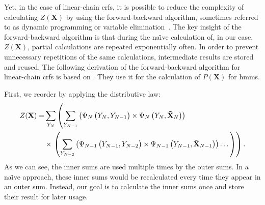 Yet, in the case of \glspl{linear-chain crf}, it is possible to reduce the complexity of calculating $Z(\mathbf{X})$ by using the \gls{forward-backward algorithm}, sometimes referred to as dynamic programming or variable elimination~\citep{sutton2010introduction,koller2009probabilistic}.
The key insight of the \gls{forward-backward algorithm} is that during the na\"{\i}ve calculation of, in our case, $Z(\mathbf{X})$, partial calculations are repeated exponentially often.
In order to prevent unnecessary repetitions of the same calculations, intermediate results are stored and reused.
The following derivation of the \gls{forward-backward algorithm} for \glspl{linear-chain crf} is based on \citet{sutton2010introduction}.
They use it for the calculation of $P(\mathbf{X})$ for \glspl{hmm}.

\bigskip

First, we reorder  by applying the distributive law:
\begin{equation}
  \begin{split}
    Z(\mathbf{X}) = & \sum_{Y_N}\left(\sum_{Y_{N-1}}\left(\Psi_N\left(\vphantom{\tilde{X}}Y_N,Y_{N-1}\right)\times\Psi_N\left(Y_N,\mathbf{\tilde{X}}_N\right)\right)\right.\\
    & \times\left.\left(\sum_{Y_{N-2}}\left(\Psi_{N-1}\left(\vphantom{\tilde{X}}Y_{N-1},Y_{N-2}\right)\times\Psi_{N-1}\left(Y_{N-1},\mathbf{\tilde{X}}_{N-1}\right)\right)\dots\vphantom{\sum_{Y_N}}\right)\right).
  \end{split}
  \label{equ:linear-chain-crf-z-distributive}
\end{equation}
As we can see, the inner sums are used multiple times by the outer sums.
In a na\"{\i}ve approach, these inner sums would be recalculated every time they appear in an outer sum.
Instead, our goal is to calculate the inner sums once and store their result for later usage.

\bigskip

